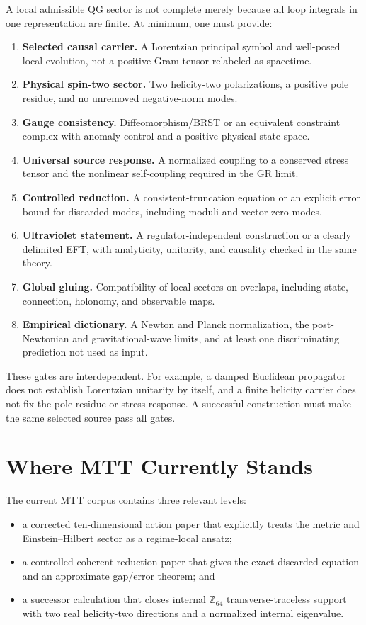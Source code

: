 \documentclass[11pt]{article}
\begin{document}
A local admissible QG sector is not complete merely because all loop
integrals in one representation are finite.  At minimum, one must provide:
\begin{enumerate}
\item \textbf{Selected causal carrier.} A Lorentzian principal symbol and
well-posed local evolution, not a positive Gram tensor relabeled as spacetime.
\item \textbf{Physical spin-two sector.} Two helicity-two polarizations, a
positive pole residue, and no unremoved negative-norm modes.
\item \textbf{Gauge consistency.} Diffeomorphism/BRST or an equivalent
constraint complex with anomaly control and a positive physical state space.
\item \textbf{Universal source response.} A normalized coupling to a
conserved stress tensor and the nonlinear self-coupling required in the GR
limit.
\item \textbf{Controlled reduction.} A consistent-truncation equation or an
explicit error bound for discarded modes, including moduli and vector zero
modes.
\item \textbf{Ultraviolet statement.} A regulator-independent construction or
a clearly delimited EFT, with analyticity, unitarity, and causality checked in
the same theory.
\item \textbf{Global gluing.} Compatibility of local sectors on overlaps,
including state, connection, holonomy, and observable maps.
\item \textbf{Empirical dictionary.} A Newton and Planck normalization,
the post-Newtonian and gravitational-wave limits, and at least one
discriminating prediction not used as input.
\end{enumerate}

These gates are interdependent.  For example, a damped Euclidean propagator
does not establish Lorentzian unitarity by itself, and a finite helicity
carrier does not fix the pole residue or stress response.  A successful
construction must make the same selected source pass all gates.

\section{Where MTT Currently Stands}

The current MTT corpus contains three relevant levels:
\begin{itemize}
\item a corrected ten-dimensional action paper that explicitly treats the
metric and Einstein--Hilbert sector as a regime-local ansatz;
\item a controlled coherent-reduction paper that gives the exact discarded
equation and an approximate gap/error theorem; and
\item a successor calculation that closes internal
\(\mathbb Z_{64}\) transverse-traceless support with two real helicity-two
directions and a normalized internal eigenvalue.
\end{itemize}
\end{document}
